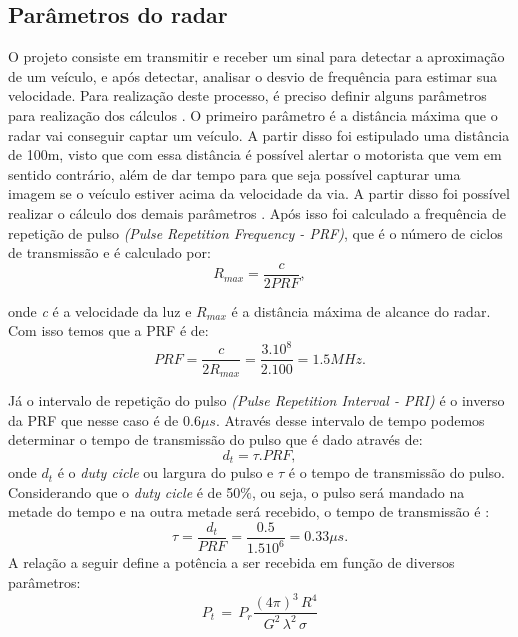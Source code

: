 \subsection{Parâmetros do radar}
O projeto consiste em transmitir e receber um sinal para detectar a aproximação de um veículo, e após detectar, analisar o desvio de frequência para estimar sua velocidade. Para realização deste processo, é preciso definir alguns parâmetros para realização dos cálculos \cite{richards}.
O primeiro parâmetro é a distância máxima que o radar vai conseguir captar um veículo. A partir disso foi estipulado uma distância de 100m, visto que com essa distância é possível alertar o motorista que vem em sentido contrário, além de dar tempo para que seja possível capturar uma imagem se o veículo estiver acima da velocidade da via. A partir disso foi possível realizar o cálculo dos demais parâmetros \cite{louis}.
Após isso foi calculado a frequência de repetição de pulso \emph{ (Pulse Repetition Frequency - PRF)}, que é o número de ciclos de transmissão e é calculado por:
\begin{equation}\label{R_MAX}
    R_{max} =  \frac{c}{2PRF},
\end{equation}

onde \emph{c} é a velocidade da luz e $R_{max}$ é a distância máxima de alcance do radar. Com isso temos que a PRF é de:
\begin{equation}\label{PRF}
  PRF =  \frac{c}{2R_{max}} = \frac{3.10^8}{2.100} = 1.5MHz.
\end{equation} \par
Já o intervalo de repetição do pulso \emph{(Pulse Repetition Interval - PRI)} é o inverso da PRF que nesse caso é de $0.6\mu s$. Através desse intervalo de tempo podemos determinar o tempo de transmissão do pulso que é dado através de: 
\begin{equation}\label{duty}
  d_t = \tau . PRF,
\end{equation}
onde $d_t$ é o \emph{duty cicle} ou largura do pulso e $\tau$ é o tempo de transmissão do pulso. Considerando que o \emph{duty cicle} é de 50$\%$, ou seja, o pulso será mandado na metade do tempo e na outra metade será recebido, o tempo de transmissão é  \cite{richards}:
\begin{equation}\label{tal}
  \tau = \frac{d_t}{PRF} =  \frac{0.5}{1.510^6} = 0.33\mu s.
\end{equation}
A relação a seguir define a potência a ser recebida em função de diversos parâmetros:
\begin{equation}\label{potencia_recebida}
    P_t\, =\,   P_r \frac{(4\pi)^{3}\,  R^{4}}{G^{2}\,   \lambda^{2}\, \sigma }  
\end{equation}%

